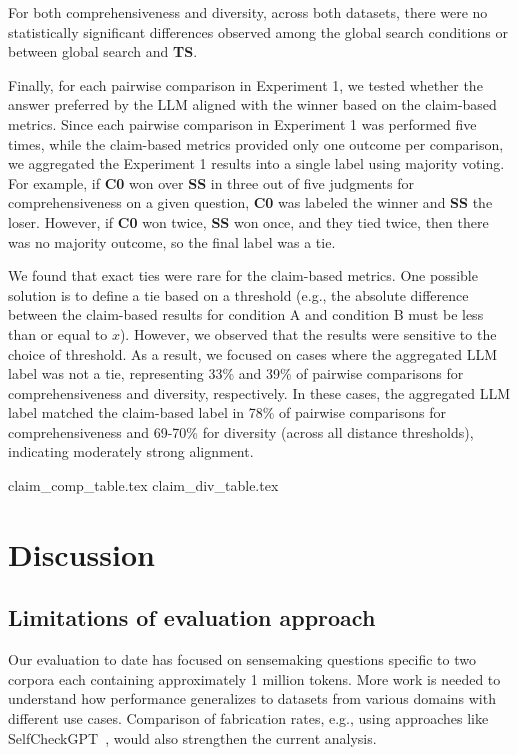 \documentclass{article}
\begin{document}
For both comprehensiveness and diversity, across both datasets, there were no statistically significant differences observed among the global search conditions or between global search and \textbf{TS}.

Finally, for each pairwise comparison in Experiment 1, we tested whether the answer preferred by the LLM aligned with the winner based on the claim-based metrics. Since each pairwise comparison in Experiment 1 was performed five times, while the claim-based metrics provided only one outcome per comparison, we aggregated the Experiment 1 results into a single label using majority voting. For example, if \textbf{C0} won over \textbf{SS} in three out of five judgments for comprehensiveness on a given question, \textbf{C0} was labeled the winner and \textbf{SS} the loser.  However, if \textbf{C0} won twice, \textbf{SS} won once, and they tied twice, then there was no majority outcome, so the final label was a tie.

We found that exact ties were rare for the claim-based metrics. One possible solution is to define a tie based on a threshold (e.g., the absolute difference between the claim-based results for condition A and condition B must be less than or equal to $x$). However, we observed that the results were sensitive to the choice of threshold. As a result, we focused on cases where the aggregated LLM label was not a tie, representing 33\% and 39\% of pairwise comparisons for comprehensiveness and diversity, respectively. In these cases, the aggregated LLM label matched the claim-based label in 78\% of pairwise comparisons for comprehensiveness and 69-70\% for diversity (across all distance thresholds), indicating moderately strong alignment.

{claim_comp_table.tex}
{claim_div_table.tex}

\section{Discussion}

\subsection{Limitations of evaluation approach}
Our evaluation to date has focused on sensemaking questions specific to two corpora each containing approximately 1 million tokens.
More work is needed to understand how performance generalizes to datasets from various domains with different use cases.
Comparison of fabrication rates, e.g., using approaches like SelfCheckGPT~\citep{manakul2023selfcheckgpt}, would also strengthen the current analysis.
\end{document}
